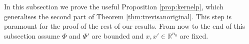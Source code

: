 \documentclass{article}
\newtheorem{lem}[thm]{Lemma}
\theoremstyle{definition}
\theoremstyle{remark}
\numberwithin{equation}{section}
\newcommand{\R}{\mathbb{R}}
\newcommand{\E}{\mathbb{E}}
\newcommand{\norm}[2]{
    \|#1\|_{#2}
}
\begin{document}
In this subsection we prove the useful Proposition \ref{prop:kernelp}, which generalises the second part of Theorem \ref{thm:trevisanoriginal}.
This step is paramount for the proof of the rest of our results.
From now to the end of this subsection assume $\Phi$ and $\Phi'$ are bounded and $x,x'\in \R^{n_0}$ are fixed.

\end{document}
